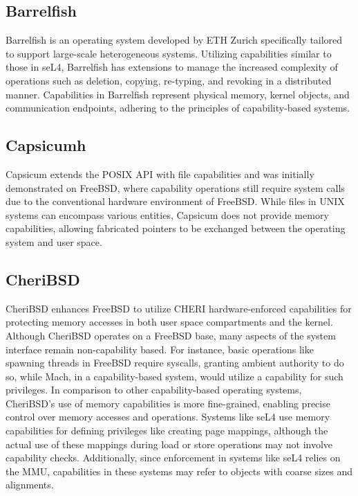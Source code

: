 \subsection{Barrelfish}
Barrelfish\cite{baumann_multikernel_2009} is an operating system developed by ETH Zurich specifically tailored to support large-scale heterogeneous systems. Utilizing capabilities 
similar to those in seL4, Barrelfish has extensions to manage the increased complexity of operations such as deletion, copying, re-typing, 
and revoking in a distributed manner. Capabilities in Barrelfish represent physical memory, kernel objects, and communication 
endpoints, adhering to the principles of capability-based systems.
\newline

\subsection{Capsicumh}
Capsicum\cite{watson_capsicum_nodate} extends the POSIX API with file capabilities and was initially demonstrated on FreeBSD, where capability operations still require 
system calls due to the conventional hardware environment of FreeBSD. While files in UNIX systems can encompass various entities, 
Capsicum does not provide memory capabilities, allowing fabricated pointers to be exchanged between the operating system and user space.
\newline

\subsection{CheriBSD}
CheriBSD\cite{noauthor_getting_nodate} enhances FreeBSD to utilize CHERI hardware-enforced capabilities for protecting memory accesses in both user space compartments 
and the kernel. Although CheriBSD operates on a FreeBSD base, many aspects of the system interface remain non-capability based. For instance, 
basic operations like spawning threads in FreeBSD require syscalls, granting ambient authority to do so, while Mach, in a capability-based system, 
would utilize a capability for such privileges. In comparison to other capability-based operating systems, CheriBSD's use of memory capabilities 
is more fine-grained, enabling precise control over memory accesses and operations. Systems like seL4 use memory capabilities for defining privileges 
like creating page mappings, although the actual use of these mappings during load or store operations may not involve capability checks. Additionally, 
since enforcement in systems like seL4 relies on the MMU, capabilities in these systems may refer to objects with coarse sizes and alignments.

